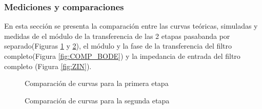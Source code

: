 \subsubsection{Mediciones y comparaciones}
En esta secci\'on se presenta la comparaci\'on entre las curvas te\'oricas, simuladas y medidas de el m\'odulo de la transferencia de las 2 etapas pasabanda por separado(Figuras \ref{fig:FIRST_LT_VS_TEO_VS_MED} y \ref{fig:SECOND_LT_VS_TEO_VS_MED}), el m\'odulo y la fase de la transferencia del filtro completo(Figura \ref{fig:COMP_BODE}) y la impedancia de entrada del filtro completo (Figura \ref{fig:ZIN}).
\begin{figure}[H]
    \centering
    \caption{Comparaci\'on de curvas para la primera etapa}
    \label{fig:FIRST_LT_VS_TEO_VS_MED}
\end{figure}
\begin{figure}[H]
    \centering
    \caption{Comparaci\'on de curvas para la segunda etapa}
    \label{fig:SECOND_LT_VS_TEO_VS_MED}
\end{figure}
